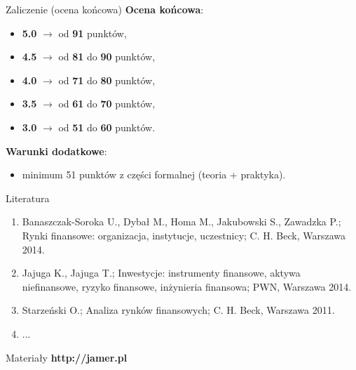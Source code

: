 \documentclass[a4paper, 11pt]{beamer}
\begin{document}
	\begin{frame}{Zaliczenie (ocena końcowa)}
		\textbf{Ocena końcowa}:
		\begin{itemize}
			\item \textbf{5.0} $\rightarrow$ od \textbf{91} punktów,
			\item \textbf{4.5} $\rightarrow$ od \textbf{81} do \textbf{90} punktów,
			\item \textbf{4.0} $\rightarrow$ od \textbf{71} do \textbf{80} punktów,
			\item \textbf{3.5} $\rightarrow$ od \textbf{61} do \textbf{70} punktów,
			\item \textbf{3.0} $\rightarrow$ od \textbf{51} do \textbf{60} punktów.
		\end{itemize}
		\textbf{Warunki dodatkowe}:
		\begin{itemize}
			\item minimum 51 punktów z części formalnej (teoria + praktyka).
		\end{itemize}
	\end{frame}
	
	\begin{frame}{Literatura}
		\begin{enumerate}
			\item Banaszczak-Soroka U., Dybał M., Homa M., Jakubowski S., Zawadzka P.; Rynki finansowe: organizacja, instytucje, uczestnicy; C. H. Beck, Warszawa 2014.
			\item Jajuga K., Jajuga T.; Inwestycje: instrumenty finansowe, aktywa niefinansowe, ryzyko finansowe, inżynieria finansowa; PWN, Warszawa 2014.
			\item Starzeński O.; Analiza rynków finansowych; C. H. Beck, Warszawa 2011.
			\item ...
		\end{enumerate}
	\end{frame}
	
	\begin{frame}{Materiały}
		\Huge\bfseries
		\centering
		http://jamer.pl
	\end{frame}
\end{document}
